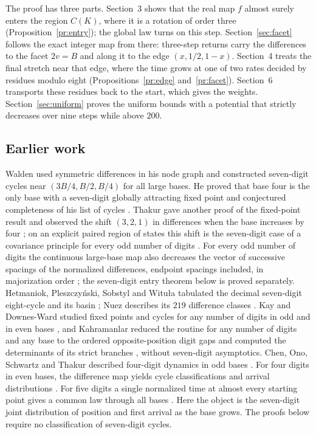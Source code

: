\documentclass[11pt,reqno]{amsart}
\begin{document}
The proof has three parts. Section~3 shows that the real map $f$ almost
surely enters the region $C(K)$, where it is a rotation of order three
(Proposition~\ref{pr:entry}); the global law turns on this step.
Section~\ref{sec:facet} follows the exact integer map from there: three-step
returns carry the differences to the facet $2v=B$ and along it to the edge
$(x,1/2,1-x)$. Section~4 treats the final stretch near that edge, where the
time grows at one of two rates decided by residues modulo eight (Propositions~\ref{pr:edge}
and~\ref{pr:facet}). Section~6 transports these residues back to the start,
which gives the weights. Section~\ref{sec:uniform} proves the uniform bounds
with a potential that strictly decreases over nine steps while above $200$.

\subsection*{Earlier work}
Walden used symmetric differences in his node graph and constructed
seven-digit cycles near $(3B/4,B/2,B/4)$ for all large bases. He proved
that base four is the only base with a seven-digit globally attracting
fixed point and conjectured completeness of his list of cycles
\cite[\S3, Lemma 4.1, Theorem 4.2 and Conjecture 4.3]{Wa}.
Thakur gave another proof of the fixed-point result and observed the
shift $(3,2,1)$ in differences when the base increases by four
\cite[Theorem 4 and \S4.3]{Th}; on an explicit paired region of states
this shift is the seven-digit case of a covariance principle for every odd
number of digits \cite[Theorem~4]{G4}.
For every odd number of digits the continuous large-base map also decreases
the vector of successive spacings of the normalized differences, endpoint
spacings included, in majorization order \cite[Theorem~1]{G4}; the seven-digit
entry theorem below is proved separately. Hetmaniok, Pleszczy\'nski, Sobstyl and
Witu{\l}a tabulated the decimal seven-digit eight-cycle and its basin
\cite[entry $n=7$]{Het}; Nuez describes its $219$ difference classes
\cite[\S6]{Nu}. Kay and Downes-Ward studied fixed points and cycles for
any number of digits in odd and in even bases \cite{KD22,KD24}, and
Kahramanlar reduced the routine for any number of digits and any base to
the ordered opposite-position digit gaps \cite[\S2]{Kah} and computed the
determinants of its strict branches \cite[\S5]{Kah}, without seven-digit
asymptotics. Chen, Ono,
Schwartz and Thakur described four-digit dynamics in odd bases \cite{COST}.
For four digits in even bases, the difference
map yields cycle classifications \cite[\S2 and Theorem 1]{G1} and
arrival distributions \cite[\S2 and Theorems 1--2]{G2}. For five digits
a single normalized time at almost every starting point gives a common law
through all bases \cite[Theorem 1 and \S2]{G3}. Here the object is the
seven-digit joint distribution of position and first arrival as the base
grows. The proofs below require no classification of seven-digit cycles.
\end{document}

